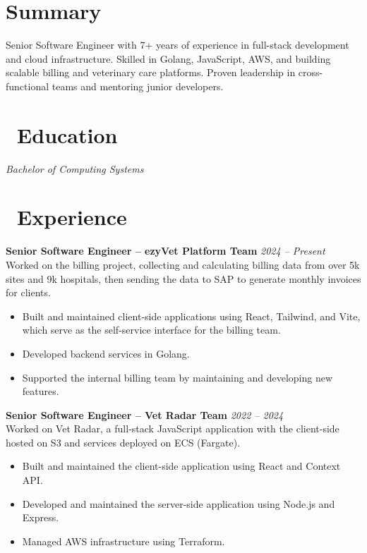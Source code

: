 \documentclass{resume}
\begin{document}


  \vspace{2em}

\section*{Summary}
Senior Software Engineer with 7+ years of experience in full-stack development and cloud infrastructure. Skilled in Golang, JavaScript, AWS, and building scalable billing and veterinary care platforms. Proven leadership in cross-functional teams and mentoring junior developers.

\section{\faGraduationCap\ Education}
\textit{Bachelor of Computing Systems}


\section{\faUsers\ Experience}
\vspace{1em}
\textbf{Senior Software Engineer – ezyVet Platform Team} \hfill \textit{2024 -- Present} \\
Worked on the billing project, collecting and calculating billing data from over 5k sites and 9k hospitals, then sending the data to SAP to generate monthly invoices for clients.
\begin{itemize}
  \item Built and maintained client-side applications using React, Tailwind, and Vite, which serve as the self-service interface for the billing team.
  \item Developed backend services in Golang.
  \item Supported the internal billing team by maintaining and developing new features.
\end{itemize}

\vspace{1em}

\textbf{Senior Software Engineer – Vet Radar Team} \hfill \textit{2022 -- 2024} \\
Worked on Vet Radar, a full-stack JavaScript application with the client-side hosted on S3 and services deployed on ECS (Fargate).
\begin{itemize}
  \item Built and maintained the client-side application using React and Context API.
  \item Developed and maintained the server-side application using Node.js and Express.
  \item Managed AWS infrastructure using Terraform.
\end{itemize}
\end{document}
